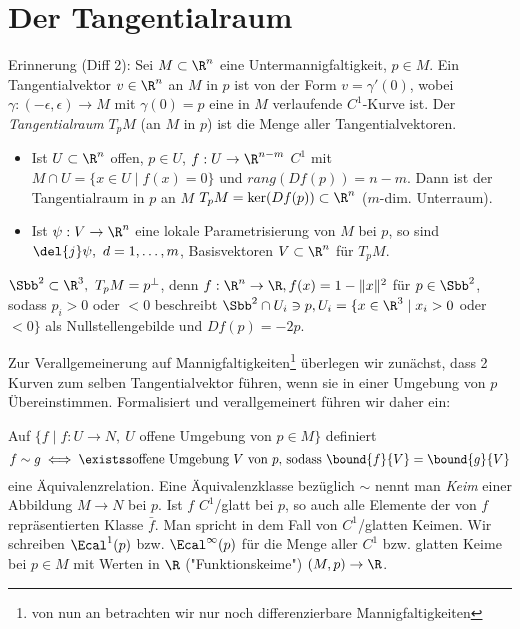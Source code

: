 \chapter{Der Tangentialraum}\lecture

Erinnerung (Diff 2): Sei $ M \subset \R^n $ eine Untermannigfaltigkeit, $p \in M$. Ein Tangentialvektor $v \in \R^n$ an $M$ in $p$ ist von der Form $ v = \gamma'(0) $, wobei $ \gamma: (-\epsilon,\epsilon) \to M $ mit $\gamma(0) = p$ eine in $M$ verlaufende $C^1$-Kurve ist. Der \emph{Tangentialraum} $T_pM$ (an $M$ in $p$) ist die Menge aller Tangentialvektoren. 
\begin{itemize}
	\item Ist $ U \subset \R^n $ offen, $p \in U$, $f: U \to \R^{n-m}$ $C^1$ mit $ M \cap U = \{x \in U \mid f(x) = 0\} $ und $rang(Df(p)) = n-m.$ Dann ist der Tangentialraum in $p$ an $M$ $ T_pM = \ker(Df(p)) \subset \R^n $ ($m$-dim. Unterraum).
	\item Ist $ \psi: V \to \R^n $ eine lokale Parametrisierung von $M$ bei $p$, so sind $ \del{j}\psi,\ d=1,\dotsc,m$, Basisvektoren $ V \subset \R^n $ für $ T_pM $.
\end{itemize}

\begin{exmp*}
	$ \Sbb^2 \subset \R^3,\ T_pM = p^\bot $, denn $ f: \R^n \to \R, f(x) = 1-\|x\|^2 $ für $ p \in \Sbb^2 $, sodass $p_i > 0$ oder $<0$ beschreibt $ \Sbb^2 \cap U_i \ni p, U_i = \{x \in \R^3 \mid x_i > 0 $ oder $ < 0\} $ als Nullstellengebilde und $ Df(p) = -2p. $
\end{exmp*}

Zur Verallgemeinerung auf Mannigfaltigkeiten\footnote{von nun an betrachten wir nur noch differenzierbare Mannigfaltigkeiten} überlegen wir zunächst, dass 2 Kurven zum selben Tangentialvektor führen, wenn sie in einer Umgebung von $p$ Übereinstimmen. Formalisiert und verallgemeinert führen wir daher ein:

\begin{defn}[Keime]
	Auf $ \{f \mid f: U \to N,\ U $ offene Umgebung von $p \in M\} $ definiert 
	$$ f \sim g \iff \existss \text{offene Umgebung } V \ \text{von } p \text{, sodass } \bound{f}{V} = \bound{g}{V} $$
	eine Äquivalenzrelation. Eine Äquivalenzklasse bezüglich $\sim$ nennt man \emph{Keim} einer Abbildung $M \to N$ bei $p$. Ist $ f $ $C^1$/glatt bei $p$, so auch alle Elemente der von $f$ repräsentierten Klasse $\bar{f}$. Man spricht in dem Fall von $C^1$/glatten Keimen. Wir schreiben $ \Ecal^1(p) $ bzw. $\Ecal^\infty(p)$ für die Menge aller $C^1$ bzw. glatten Keime bei $p \in M$ mit Werten in $\R$ ("Funktionskeime") $ (M,p) \to \R $.
\end{defn}

